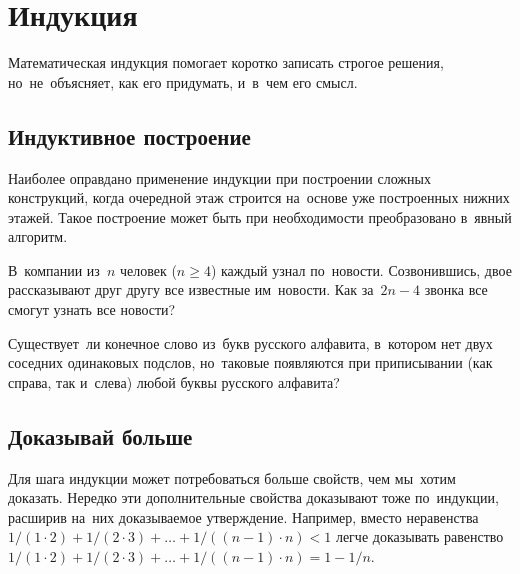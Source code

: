 
\section*{Индукция}



Математическая индукция помогает коротко записать строгое решения,
но~не~объясняет, как его придумать, и~в~чем его смысл.

\subsection*{Индуктивное построение}

Наиболее оправдано применение индукции при построении сложных конструкций,
когда очередной этаж строится на~основе уже построенных нижних этажей.
Такое построение может быть при необходимости преобразовано в~явный алгоритм.

\begin{problems}

\item
В~компании из~$n$ человек ($n \geq 4$) каждый узнал по~новости.
Созвонившись, двое рассказывают друг другу все известные им~новости.
Как за~$2 n - 4$ звонка все смогут узнать все новости?

\item
Существует~ли конечное слово из~букв русского алфавита, в~котором нет двух
соседних одинаковых подслов, но~таковые появляются при приписывании
(как справа, так и~слева) любой буквы русского алфавита?

\end{problems}

\subsection*{Доказывай больше}

Для шага индукции может потребоваться больше свойств, чем мы~хотим доказать.
Нередко эти дополнительные свойства доказывают тоже по~индукции, расширив
на~них доказываемое утверждение.
Например, вместо неравенства
\(
    1 / (1 \cdot 2) + 1 / (2 \cdot 3) + \ldots + 1 / ((n-1) \cdot n)
<
    1
\)
легче доказывать равенство
\(
    1 / (1 \cdot 2) + 1 / (2 \cdot 3) + \ldots + 1 / ((n - 1) \cdot n)
=
    1 - 1 / n
\).


